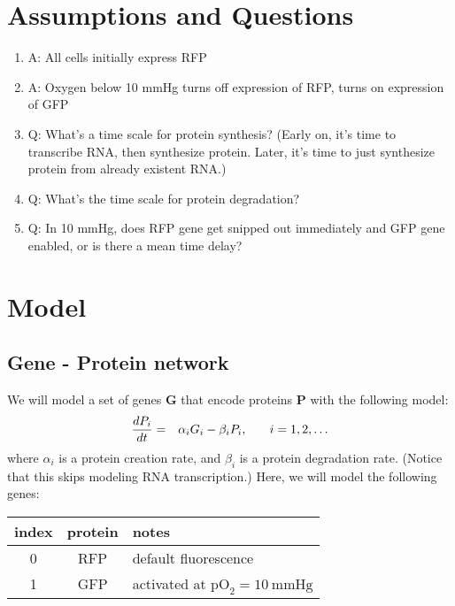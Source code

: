 \documentclass[12pt]{article}
\renewcommand{\vec}[1]{\mathbf{#1}}
\newcommand{\oxy}{  {\textrm{pO}_2} }
\newcommand{\mmHg}{\: \textrm{mmHg} }
\begin{document}
\section{Assumptions and Questions}
\begin{enumerate}

\item 
A: All cells initially express RFP

\item 
A: Oxygen below 10 mmHg turns off expression of RFP, turns on expression of GFP

\item 
Q: What's a time scale for protein synthesis? (Early on, it's time to transcribe RNA, then synthesize protein. Later, it's time to just synthesize protein from already existent RNA.) 

\item 
Q: What's the time scale for protein degradation? 

\item 
Q: In 10 mmHg, does RFP gene get snipped out immediately and GFP gene enabled, or is there a mean time delay? 


\end{enumerate}

\section{Model}

\subsection{Gene - Protein network}
We will model a set of genes $\vec{G}$ that encode proteins $\vec{P}$ with the following model: 
\begin{eqnarray}
\frac{ d P_i }{dt} & = & \alpha_i G_i - \beta_i P_i, \hspace{.25in} i = 1, 2, \ldots 
\end{eqnarray}
where $\alpha_i$ is a protein creation rate, and $\beta_i$ is a protein degradation rate. (Notice that this 
skips modeling RNA transcription.) Here, we will model the following genes: \\

\begin{center}
\begin{tabular}{c|c|l}
index & protein & notes \\
 \hline 
 0 & RFP & default fluorescence \\
 1 & GFP & activated at $\oxy = 10 \mmHg $ 
\end{tabular}
\end{center}
\end{document}
